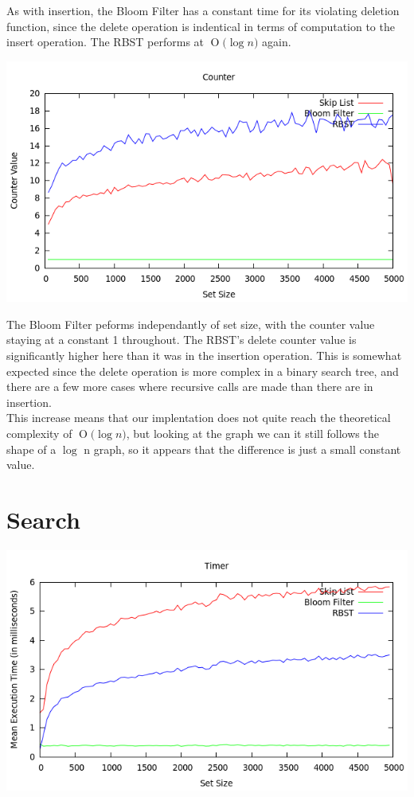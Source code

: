 \documentclass[11pt, notitlepage]{report}
\newcommand{\BigO}[1]{\ensuremath{\operatorname{O}\bigl(#1\bigr)}}
\begin{document}
As with insertion, the Bloom Filter has a constant time for its violating deletion function, since the delete operation is indentical in terms of computation to the insert operation. The RBST performs at \BigO{\log n} again.

\includegraphics[width=\linewidth]{img/Counter-Del}

The Bloom Filter peforms independantly of set size, with the counter value staying at a constant 1 throughout. The RBST's delete counter value is significantly higher here than it was in the insertion operation. This is somewhat expected since the delete operation is more complex in a binary search tree, and there are a few more cases where recursive calls are made than there are in insertion.\\

This increase means that our implentation does not quite reach the theoretical complexity of \BigO{\log n}, but looking at the graph we can it still follows the shape of a $\log$ n graph, so it appears that the difference is just a small constant value.

\section*{Search}

\includegraphics[width=\linewidth]{img/Timer-Find}
\end{document}
